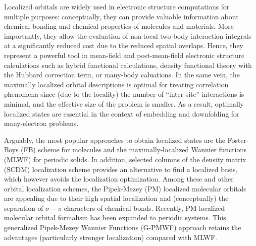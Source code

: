 \documentclass[journal=jacsat,manuscript=article]{achemso}
\begin{document}
Localized orbitals are widely used in electronic structure computations for multiple purposes: conceptually, they can provide valuable information about chemical bonding and chemical properties of molecules and materials. More importantly, they allow the evaluation of non-local two-body interaction integrals at a significantly reduced cost due to the reduced spatial overlaps. Hence, they represent a powerful tool in mean-field and post-mean-field electronic structure calculations such as hybrid functional calculations\cite{Wu2009,Gygi2013}, density functional theory with the Hubbard correction term\cite{Miyake2009,Tomczak2009}, or many-body caluations.\cite{Choi2012,Weng2021} In the same vein, the maximally localized orbital descriptions is optimal for treating correlation phenomena since (due to the locality) the number of ``inter-site'' interactions is minimal, and the effective size of the problem is smaller. As a result, optimally localized states are essential in the context of embedding and downfolding for many-electron problems\cite{Aryasetiawan2009,Pvarini2011,Bowler2012,Lau2021}. 

Arguably, the most popular approaches to obtain localized states are the Foster-Boys (FB) scheme \cite{Boys1960,Foster1960} for molecules and the maximally-localized Wannier functions (MLWF)\cite{Marzari1997,Marzari2012} for periodic solids. In addition, selected columns of the density matrix (SCDM)\cite{Damle2015} localization scheme provides an alternative to find a localized basis,\cite{Damle2017,Damle2018,Damle2019,Vitale2020} which however avoids the localization optimization. Among these and other orbital localization schemes\cite{Edmiston1963,Edmiston1965,Lowdin1966,Niessen1972,Damle2015}, the Pipek-Mezey (PM) localized molecular orbitals \cite{Pipek1989} are appealing due to their high spatial  localization and (conceptually) the separation of $\sigma-\pi$ characters of chemical bonds. Recently, PM localized molecular orbital formalism has been expanded to periodic systems\cite{Jonsson2017}. This generalized Pipek-Mezey Wannier Functions (G-PMWF) approach retains the advantages (particularly stronger localization) compared with MLWF. 
\end{document}
